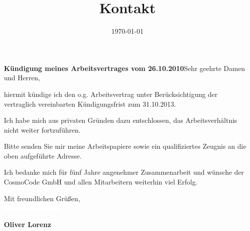 \documentclass[11pt,a4paper,sans]{moderncv} %
\title{Kontakt}
\begin{document}


\clearpage

\date{\today} %
\opening{\textbf{Kündigung meines Arbeitsvertrages vom 26.10.2010}\newline{}\newline{}Sehr geehrte Damen und Herren,} %
\closing{} %

\makelettertitle %

hiermit kündige ich den o.g. Arbeitsvertrag unter Berücksichtigung der vertraglich vereinbarten Kündigungsfrist zum 31.10.2013.
 
Ich habe mich aus privaten Gründen dazu entschlossen, das Arbeitsverhältnis nicht weiter fortzuführen.
 
Bitte senden Sie mir meine Arbeitspapiere sowie ein qualifiziertes Zeugnis an die oben aufgeführte Adresse. 

Ich bedanke mich für fünf Jahre angenehmer Zusammenarbeit und wünsche der CosmoCode GmbH und allen Mitarbeitern weiterhin viel Erfolg.

Mit freundlichen Grüßen,\\[1.5em]
\includegraphics[width=3cm]{pictures/signature}

\bfseries{Oliver Lorenz}


\end{document}
